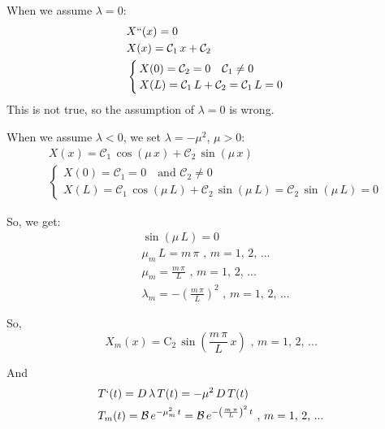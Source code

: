 \documentclass[../main.tex]{subfiles}
\begin{document}
When we assume $\lambda = 0$:
\begin{align}
    & X``(x) = 0 \\
    & X(x) = \mathcal{C}_1 \, x + \mathcal{C}_2 \\
    & \begin{cases}
        \, X(0) = \mathcal{C}_2 = 0 \quad \mathcal{C}_1 \neq 0 \\
        \, X(L) = \mathcal{C}_1 \, L + \mathcal{C}_2 = \mathcal{C}_1 \, L = 0
    \end{cases}
\end{align}
This is not true, so the assumption of $\lambda = 0$ is wrong.

When we assume $\lambda < 0$, we set $\lambda = - \mu^2$, $\mu > 0$:
\begin{align}
    & X(x) = \mathcal{C}_1 \, \cos{(\mu \, x)} + \mathcal{C}_2 \, \sin{(\mu \, x)} \\
    & \begin{cases}
        X(0) = \mathcal{C}_1 = 0 \quad \text{and } \mathcal{C}_2 \neq 0 \\
        X(L) = \mathcal{C}_1 \, \cos{(\mu \, L)} + \mathcal{C}_2 \, \sin{(\mu \, L)} = \mathcal{C}_2 \, \sin{(\mu \, L)} = 0
    \end{cases}
\end{align}

So, we get:
\begin{align}
    & \sin{(\mu \, L)} = 0 \\
    & \mu_m \, L = m \, \pi \text{ ,  } m = 1 \text{, } 2 \text{, ...} \\
    & \mu_m = \frac{m \, \pi}{L} \text{ ,  } m = 1 \text{, } 2 \text{, ...} \\
    & \lambda_m = - \left(\frac{m \, \pi}{L}\right)^2 \text{ ,  } m = 1 \text{, } 2 \text{, ...}
\end{align}

So,
\begin{equation}
    X_m(x) = \mathrm{C}_2 \, \sin{\left(\frac{m \, \pi}{L} \, x\right)} \text{ ,  } m = 1 \text{, } 2 \text{, ...}
\end{equation}

And
\begin{align}
    & T`(t) = D \, \lambda \, T(t) = - \mu^2 \, D \, T(t) \\
    & T_m(t) = \mathcal{B} \, e^{- \mu_m^2 \, t} = \mathcal{B} \, e^{- \left(\frac{m \, \pi}{L}\right)^2 \, t} \text{ ,  } m = 1 \text{, } 2 \text{, ...}
\end{align}
\end{document}
